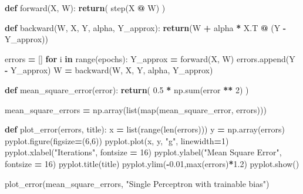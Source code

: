 \documentclass[
]{book}
\newenvironment{Shaded}{\begin{snugshade}}{\end{snugshade}}
\newcommand{\BuiltInTok}[1]{#1}
\newcommand{\ControlFlowTok}[1]{\textcolor[rgb]{0.13,0.29,0.53}{\textbf{#1}}}
\newcommand{\DecValTok}[1]{\textcolor[rgb]{0.00,0.00,0.81}{#1}}
\newcommand{\FloatTok}[1]{\textcolor[rgb]{0.00,0.00,0.81}{#1}}
\newcommand{\KeywordTok}[1]{\textcolor[rgb]{0.13,0.29,0.53}{\textbf{#1}}}
\newcommand{\NormalTok}[1]{#1}
\newcommand{\OperatorTok}[1]{\textcolor[rgb]{0.81,0.36,0.00}{\textbf{#1}}}
\newcommand{\StringTok}[1]{\textcolor[rgb]{0.31,0.60,0.02}{#1}}
\begin{document}
\begin{Shaded}
\begin{Highlighting}[]
\KeywordTok{def}\NormalTok{ forward(X, W):}
  \ControlFlowTok{return}\NormalTok{( step(X }\OperatorTok{@}\NormalTok{ W) )}

\KeywordTok{def}\NormalTok{ backward(W, X, Y, alpha, Y\_approx):}
    \ControlFlowTok{return}\NormalTok{(W }\OperatorTok{+}\NormalTok{ alpha }\OperatorTok{*}\NormalTok{ X.T }\OperatorTok{@}\NormalTok{ (Y }\OperatorTok{{-}}\NormalTok{ Y\_approx))}
  
  
\NormalTok{errors }\OperatorTok{=}\NormalTok{ []}
\ControlFlowTok{for}\NormalTok{ i }\KeywordTok{in} \BuiltInTok{range}\NormalTok{(epochs):}
\NormalTok{  Y\_approx }\OperatorTok{=}\NormalTok{ forward(X, W)}
\NormalTok{  errors.append(Y }\OperatorTok{{-}}\NormalTok{ Y\_approx)}
\NormalTok{  W }\OperatorTok{=}\NormalTok{ backward(W, X, Y, alpha, Y\_approx)}
  
  
  
\KeywordTok{def}\NormalTok{ mean\_square\_error(error):}
  \ControlFlowTok{return}\NormalTok{( }\FloatTok{0.5} \OperatorTok{*}\NormalTok{ np.}\BuiltInTok{sum}\NormalTok{(error }\OperatorTok{**} \DecValTok{2}\NormalTok{) )}


\NormalTok{mean\_square\_errors }\OperatorTok{=}\NormalTok{ np.array(}\BuiltInTok{list}\NormalTok{(}\BuiltInTok{map}\NormalTok{(mean\_square\_error, errors)))}


\KeywordTok{def}\NormalTok{ plot\_error(errors, title):}
\NormalTok{  x }\OperatorTok{=} \BuiltInTok{list}\NormalTok{(}\BuiltInTok{range}\NormalTok{(}\BuiltInTok{len}\NormalTok{(errors)))}
\NormalTok{  y }\OperatorTok{=}\NormalTok{ np.array(errors)}
\NormalTok{  pyplot.figure(figsize}\OperatorTok{=}\NormalTok{(}\DecValTok{6}\NormalTok{,}\DecValTok{6}\NormalTok{))}
\NormalTok{  pyplot.plot(x, y, }\StringTok{"g"}\NormalTok{, linewidth}\OperatorTok{=}\DecValTok{1}\NormalTok{)}
\NormalTok{  pyplot.xlabel(}\StringTok{"Iterations"}\NormalTok{, fontsize }\OperatorTok{=} \DecValTok{16}\NormalTok{)}
\NormalTok{  pyplot.ylabel(}\StringTok{"Mean Square Error"}\NormalTok{, fontsize }\OperatorTok{=} \DecValTok{16}\NormalTok{)}
\NormalTok{  pyplot.title(title)}
\NormalTok{  pyplot.ylim(}\OperatorTok{{-}}\FloatTok{0.01}\NormalTok{,}\BuiltInTok{max}\NormalTok{(errors)}\OperatorTok{*}\FloatTok{1.2}\NormalTok{)}
\NormalTok{  pyplot.show()}
  
  
\NormalTok{plot\_error(mean\_square\_errors, }\StringTok{"Single Perceptron with trainable bias"}\NormalTok{)}
\end{Highlighting}
\end{Shaded}
\end{document}
